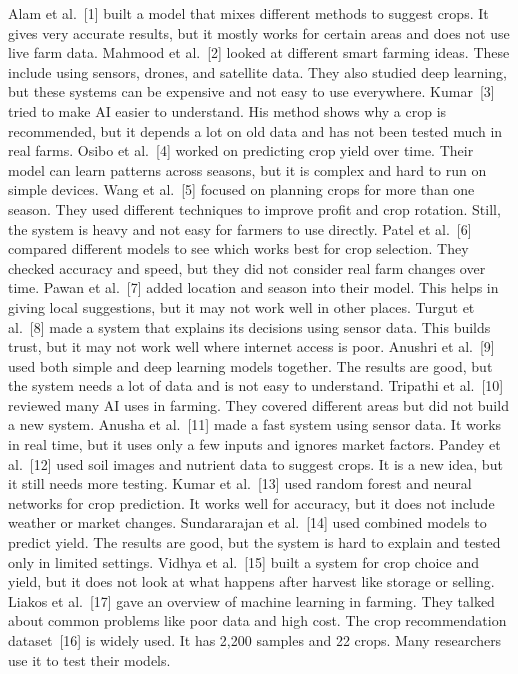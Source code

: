 \documentclass[conference]{IEEEtran}
\begin{document}
Alam et al.~[1] built a model that mixes different methods to suggest crops.
It gives very accurate results, but it mostly works for certain areas and does
not use live farm data. Mahmood et al.~[2] looked at different smart farming
ideas. These include using sensors, drones, and satellite data. They also
studied deep learning, but these systems can be expensive and not easy to use
everywhere. Kumar~[3] tried to make AI easier to understand. His method shows
why a crop is recommended, but it depends a lot on old data and has not been
tested much in real farms. Osibo et al.~[4] worked on predicting crop yield
over time. Their model can learn patterns across seasons, but it is complex
and hard to run on simple devices. Wang et al.~[5] focused on planning crops
for more than one season. They used different techniques to improve profit and
crop rotation. Still, the system is heavy and not easy for farmers to use
directly. Patel et al.~[6] compared different models to see which works best
for crop selection. They checked accuracy and speed, but they did not consider
real farm changes over time. Pawan et al.~[7] added location and season into
their model. This helps in giving local suggestions, but it may not work well
in other places. Turgut et al.~[8] made a system that explains its decisions
using sensor data. This builds trust, but it may not work well where internet
access is poor. Anushri et al.~[9] used both simple and deep learning models
together. The results are good, but the system needs a lot of data and is not
easy to understand. Tripathi et al.~[10] reviewed many AI uses in farming.
They covered different areas but did not build a new system. Anusha et al.~[11]
made a fast system using sensor data. It works in real time, but it uses only a
few inputs and ignores market factors. Pandey et al.~[12] used soil images and
nutrient data to suggest crops. It is a new idea, but it still needs more
testing. Kumar et al.~[13] used random forest and neural networks for crop
prediction. It works well for accuracy, but it does not include weather or
market changes. Sundararajan et al.~[14] used combined models to predict yield.
The results are good, but the system is hard to explain and tested only in
limited settings. Vidhya et al.~[15] built a system for crop choice and yield,
but it does not look at what happens after harvest like storage or selling.
Liakos et al.~[17] gave an overview of machine learning in farming. They talked
about common problems like poor data and high cost. The crop recommendation
dataset~[16] is widely used. It has 2,200 samples and 22 crops. Many
researchers use it to test their models.
\end{document}
